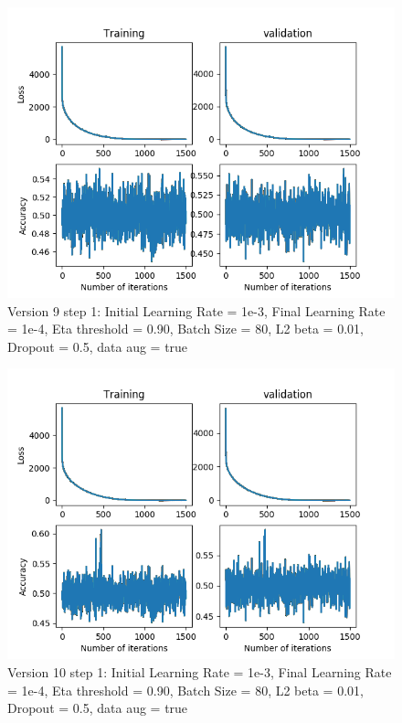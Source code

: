 \documentclass[12pt,reqno]{amsart}
\numberwithin{equation}{section}
\begin{document}
\begin{enumerate}
\begin{figure}[H]
\centering
\includegraphics[scale=0.6]{data_liquid5_version9_step1}
\caption{Version 9 step 1: Initial Learning Rate = 1e-3, Final Learning Rate = 1e-4, Eta threshold = 0.90, Batch Size = 80, L2 beta = 0.01, Dropout = 0.5, data aug = true}
\end{figure}

\begin{figure}[H]
\centering
\includegraphics[scale=0.6]{data_liquid5_version10_step1}
\caption{Version 10 step 1: Initial Learning Rate = 1e-3, Final Learning Rate = 1e-4, Eta threshold = 0.90, Batch Size = 80, L2 beta = 0.01, Dropout = 0.5, data aug = true}
\end{figure}


\end{enumerate}
\end{document}
